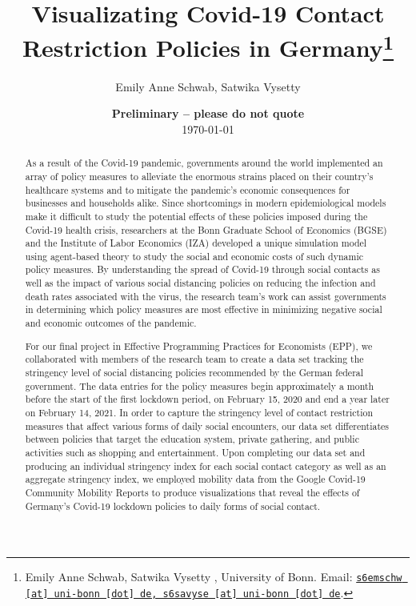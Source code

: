 \documentclass[11pt, a4paper, leqno]{article}
\begin{document}
\title{Visualizating Covid-19 Contact Restriction Policies in Germany\thanks{Emily Anne Schwab, Satwika Vysetty , University of Bonn. Email: \href{mailto:s6emschw@uni-bonn.de, s6savyse@uni-bonn.de}{\nolinkurl{s6emschw [at] uni-bonn [dot] de, s6savyse [at] uni-bonn [dot] de}}.}}

\author{Emily Anne Schwab, Satwika Vysetty}

\date{
    {\bf Preliminary -- please do not quote}
    \\[1ex]
    \today
}

\maketitle


\begin{abstract}
As a result of the Covid-19 pandemic, governments around the world implemented an array of policy measures to alleviate the enormous strains placed on their country’s healthcare systems and to mitigate the pandemic’s economic consequences for businesses and households alike. Since shortcomings in modern epidemiological models make it difficult to study the potential effects of these policies imposed during the Covid-19 health crisis, researchers at the Bonn Graduate School of Economics (BGSE) and the Institute of Labor Economics (IZA) developed a unique simulation model using agent-based theory to study the social and economic costs of such dynamic policy measures. By understanding the spread of Covid-19 through social contacts as well as the impact of various social distancing policies on reducing the infection and death rates associated with the virus, the research team’s work can assist governments in determining which policy measures are most effective in minimizing negative social and economic outcomes of the pandemic.

For our final project in Effective Programming Practices for Economists (EPP), we collaborated with members of the research team to create a data set tracking the stringency level of social distancing policies recommended by the German federal government. The data entries for the policy measures begin approximately a month before the start of the first lockdown period, on February 15, 2020 and end a year later on February 14, 2021. In order to capture the stringency level of contact restriction measures that affect various forms of daily social encounters, our data set differentiates between policies that target the education system, private gathering, and public activities such as shopping and entertainment. Upon completing our data set and producing an individual stringency index for each social contact category as well as an aggregate stringency index, we employed mobility data from the Google Covid-19 Community Mobility Reports to produce visualizations that reveal the effects of Germany’s Covid-19 lockdown policies to daily forms of social contact.
\end{abstract}
\clearpage
\end{document}
